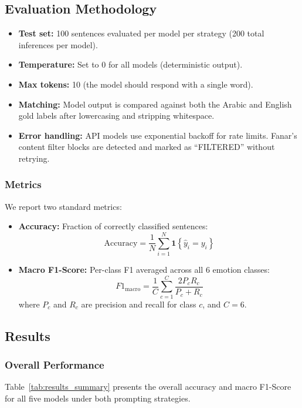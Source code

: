 \subsection{Evaluation Methodology}

\begin{itemize}
    \item \textbf{Test set:} 100 sentences evaluated per model per strategy (200 total inferences per model).
    \item \textbf{Temperature:} Set to 0 for all models (deterministic output).
    \item \textbf{Max tokens:} 10 (the model should respond with a single word).
    \item \textbf{Matching:} Model output is compared against both the Arabic and English gold labels after lowercasing and stripping whitespace.
    \item \textbf{Error handling:} API models use exponential backoff for rate limits. Fanar's content filter blocks are detected and marked as ``FILTERED'' without retrying.
\end{itemize}

\subsubsection{Metrics}
We report two standard metrics:
\begin{itemize}
    \item \textbf{Accuracy:} Fraction of correctly classified sentences:
    $$\mathrm{Accuracy} = \frac{1}{N}\sum_{i=1}^N \mathbf{1}\!\left\{\hat{y}_i = y_i\right\}$$
    \item \textbf{Macro F1-Score:} Per-class F1 averaged across all 6 emotion classes:
    $$F1_{\text{macro}} = \frac{1}{C} \sum_{c=1}^C \frac{2P_c R_c}{P_c + R_c}$$
    where $P_c$ and $R_c$ are precision and recall for class $c$, and $C=6$.
\end{itemize}

\subsection{Results}

\subsubsection{Overall Performance}

Table~\ref{tab:results_summary} presents the overall accuracy and macro F1-Score for all five models under both prompting strategies.

